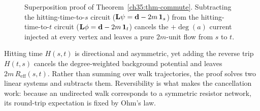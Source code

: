 \begin{figure}[htbp]
\caption{Superposition proof of Theorem~\ref{ch35:thm-commute}. Subtracting the hitting-time-to-$s$ circuit ($\mathbf{L}\psi=\mathbf{d}-2m\,\mathbf{1}_s$) from the hitting-time-to-$t$ circuit ($\mathbf{L}\phi=\mathbf{d}-2m\,\mathbf{1}_t$) cancels the $+\deg(a)$ current injected at every vertex and leaves a pure $2m$-unit flow from $s$ to $t$.}
\label{fig:ch35-superposition}
\end{figure}

\begin{aestheticbox}
Hitting time $H(s,t)$ is directional and asymmetric, yet adding the reverse trip $H(t,s)$ cancels the degree-weighted background potential and leaves $2m\,R_{\mathrm{eff}}(s,t)$. Rather than summing over walk trajectories, the proof solves two linear systems and subtracts them. Reversibility is what makes the cancellation work: because an undirected walk corresponds to a symmetric resistor network, its round-trip expectation is fixed by Ohm's law.
\end{aestheticbox}

